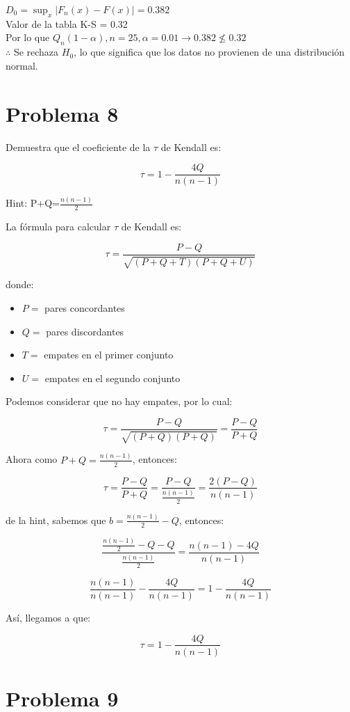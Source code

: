 \documentclass{article}
\begin{document}
$D_0 = \sup_x |F_n(x) - F(x)| = 0.382$ \\
Valor de la tabla K-S = 0.32 \\
Por lo que $Q_n(1-\alpha), n=25, \alpha=0.01 \rightarrow 0.382 \not\leq 0.32$ \\
$\therefore$ Se rechaza $H_0$, lo que significa que los datos no provienen de una distribución normal.

\newpage

\section{Problema 8}

Demuestra que el coeficiente de la $\tau$ de Kendall es:

$$\tau=1-\frac{4Q}{n(n-1)}$$

Hint: P+Q=$\frac{n(n-1)}{2}$

La fórmula para calcular $\tau$ de Kendall es:

\[
    \tau = \frac{P-Q}{\sqrt{(P+Q+T)(P+Q+U)}}
\]

donde:

\begin{itemize}
    \item $P =$ pares concordantes
    \item $Q =$ pares discordantes
    \item $T =$ empates en el primer conjunto
    \item $U =$ empates en el segundo conjunto
\end{itemize}

Podemos considerar que no hay empates, por lo cual:

\[
    \tau = \frac{P-Q}{\sqrt{(P+Q)(P+Q)}} = \frac{P-Q}{P + Q}
\]

Ahora como $P+Q = \frac{n(n-1)}{2}$, entonces:

\[
    \tau = \frac{P-Q}{P+Q} = \frac{P-Q}{\frac{n(n-1)}{2}} = \frac{2(P-Q)}{n(n-1)}
\]

de la hint, sabemos que $b = \frac{n(n-1)}{2} - Q$, entonces:

\[
    \frac{\frac{n(n-1)}{2} - Q - Q}{\frac{n(n-1)}{2}} = \frac{n(n-1)-4Q}{n(n-1)}
\]

\[
    \frac{n(n-1)}{n(n-1)} - \frac{4Q}{n(n-1)} = 1-\frac{4Q}{n(n-1)}
\]

Así, llegamos a que:

\[
    \boxed{\tau = 1 - \frac{4Q}{n(n-1)}}
\]

\newpage

\section{Problema 9}
\end{document}
